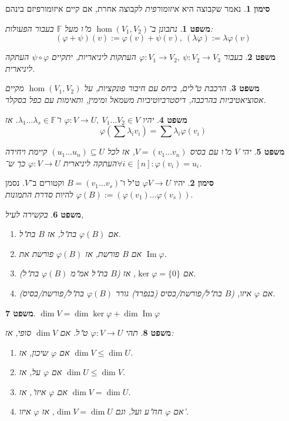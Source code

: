\documentclass[]{article}
\DeclareMathOperator\Img   {Im}
\newcommand\F         {\mathbb{F}}
\newcommand\co        {\colon}
\renewcommand\lg      {\lambda}
\renewcommand\phi     {\varphi}
\newtheorem{Theorem}{משפט}
\theoremstyle{definition}
\newtheorem{Notion}{סימון}
\newcommand\theo  [1] {\begin{Theorem}#1\end{Theorem}}
\newcommand\noti  [1] {\begin{Notion}#1\end{Notion}}
\begin{document}
\begin{multicols}{2}
		\noti{נאמר שקבוצה היא \textit{איזומורפית} לקבוצה אחרת, אם קיים איזומורפיזם בינהם}
		\theo{נתבונן ב־$\hom(V_1, V_2)$ מ"ו מעל $\F$ בעבור הפעולות: 
		\[ (\phi + \psi)(v) := \phi(v) + \psi(v), \ (\lg\phi) := \lg\phi(v) \]}
		\theo{בעבור $\phi \co V_1 \to V_2, \ \psi \co V_2 \to V_3$ העתקות ליניאריות, יתקיים $\psi \circ \phi$ העתקה ליניארית. }
		\theo{הרכבת ט"לים, ביחס עם חיבור פונקציות, על $\hom(V_1, V_2)$ מקיים אסוציאטיביות בהרכבה, דיסטרביוטיביות משמאל ומימין, ותאימות עם כפל בסקלר. }
		\theo{יהיו $\phi \co V \to U, \ V_1 \dots V_2 \in V$ ו־$\lg_1 \dots \lg_s \in \F$. אז 
		\[ \phi(\sum\lg_iv_i) = \sum\lg_i\phi(v_i) \]}
		\theo{יהי $V$ מ"ו עם בסיס $V = (v_1 \dots v_n)$, אז לכל $(u_1 \dots u_n) \subseteq U$ קיימת ויחידה העתקה ליניארית $\phi \co V \to U$ כך ש־$\forall i \in [n] \co \phi(v_i) = u_i$. }
		\noti{יהיו $\phi V \to U$ ט"ל ו־$B = (v_1 \dots v_s)$ וקטורים ב־$V$. נסמן $\phi(B) := (\phi(v_1) \dots \phi(v_s))$ להיות \textit{סדרת התמונות}. }
		\theo{בקשירה לעיל, 
		\begin{enumerate}
			\item אם $\phi(B)$ בת"ל, אז $B$ בת"ל. 
			\item אם $B$ פורשת, אז $\phi(B)$ פורשת את $\Img\phi$. 
			\item אם $\ker\phi = \{0\}$, אז ($B$ בת"ל אמ"מ $\phi(B)$ בת"ל). 
			\item אם $\phi$ איזו, ($B$ בת"ל/פורשת/בסיס (בנפרד) גורר $\phi(B)$ בת"ל/פורשת/בסיס). 
		\end{enumerate}}
		\theo{\hfil $\dim V = \dim \ker\phi + \dim\Img\phi$}
		\theo{תהי $\phi \co V \to U$ ט"ל. אם $\dim V$ סופי, אז: 
		\begin{enumerate}
			\item אם $\phi$ שיכון, אז $\dim V \le \dim U$. 
			\item אם $\phi$ על, אז $\dim U \le \dim V$. 
			\item אם $\phi$ איזו', אז $\dim V = \dim U$. 
			\item אם $\phi$ חח"ע ועל, וגם $\dim V = \dim U$, אז $\phi$ איזו'. 
		\end{enumerate}}
		
		\pagebreak

\end{multicols}
\end{document}
